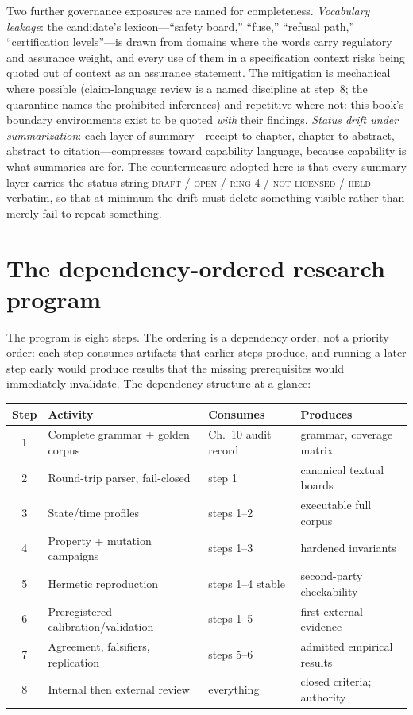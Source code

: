 Two further governance exposures are named for completeness. \emph{Vocabulary leakage}: the candidate's lexicon---``safety board,'' ``fuse,'' ``refusal path,'' ``certification levels''---is drawn from domains where the words carry regulatory and assurance weight, and every use of them in a specification context risks being quoted out of context as an assurance statement. The mitigation is mechanical where possible (claim-language review is a named discipline at step~8; the quarantine names the prohibited inferences) and repetitive where not: this book's boundary environments exist to be quoted \emph{with} their findings. \emph{Status drift under summarization}: each layer of summary---receipt to chapter, chapter to abstract, abstract to citation---compresses toward capability language, because capability is what summaries are for. The countermeasure adopted here is that every summary layer carries the status string \textsc{draft / open / ring 4 / not licensed / held} verbatim, so that at minimum the drift must delete something visible rather than merely fail to repeat something.

\section{The dependency-ordered research program}\label{ch12:program}

The program is eight steps. The ordering is a dependency order, not a priority order: each step consumes artifacts that earlier steps produce, and running a later step early would produce results that the missing prerequisites would immediately invalidate. The dependency structure at a glance:

\begin{center}
\small
\begin{tabular}{@{}clll@{}}
\toprule
Step & Activity & Consumes & Produces \\
\midrule
1 & Complete grammar + golden corpus & Ch.~10 audit record & grammar, coverage matrix \\
2 & Round-trip parser, fail-closed & step 1 & canonical textual boards \\
3 & State/time profiles & steps 1--2 & executable full corpus \\
4 & Property + mutation campaigns & steps 1--3 & hardened invariants \\
5 & Hermetic reproduction & steps 1--4 stable & second-party checkability \\
6 & Preregistered calibration/validation & steps 1--5 & first external evidence \\
7 & Agreement, falsifiers, replication & steps 5--6 & admitted empirical results \\
8 & Internal then external review & everything & closed criteria; authority \\
\bottomrule
\end{tabular}
\end{center}

